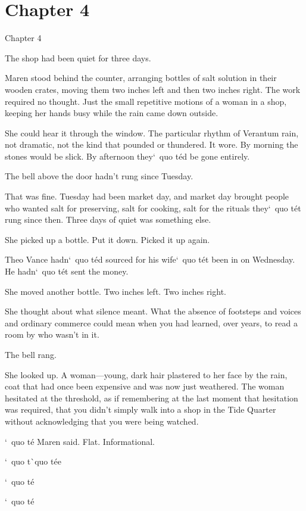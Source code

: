 \documentclass[12pt,letterpaper,openany]{book}
\begin{document}
\chapter{Chapter 4}
Chapter 4
\par
The shop had been quiet for three days.
\par
Maren stood behind the counter, arranging bottles of salt solution in their wooden crates, moving them two inches left and then two inches right. The work required no thought. Just the small repetitive motions of a woman in a shop, keeping her hands busy while the rain came down outside.
\par
She could hear it through the window. The particular rhythm of Verantum rain, not dramatic, not the kind that pounded or thundered. It wore. By morning the stones would be slick. By afternoon they`\ quo t\'e{}d be gone entirely.
\par
The bell above the door hadn't rung since Tuesday.
\par
That was fine. Tuesday had been market day, and market day brought people who wanted salt for preserving, salt for cooking, salt for the rituals they`\ quo t\'e{}t rung since then. Three days of quiet was something else.
\par
She picked up a bottle. Put it down. Picked it up again.
\par
Theo Vance hadn`\ quo t\'e{}d sourced for his wife`\ quo t\'e{}t been in on Wednesday. He hadn`\ quo t\'e{}t sent the money.
\par
She moved another bottle. Two inches left. Two inches right.
\par
She thought about what silence meant. What the absence of footsteps and voices and ordinary commerce could mean when you had learned, over years, to read a room by who wasn't in it.
\par
The bell rang.
\par
She looked up. A woman—young, dark hair plastered to her face by the rain, coat that had once been expensive and was now just weathered. The woman hesitated at the threshold, as if remembering at the last moment that hesitation was required, that you didn't simply walk into a shop in the Tide Quarter without acknowledging that you were being watched.
\par
`\ quo t\'e{} Maren said. Flat. Informational.
\par
`\ quo t\`\ quo t\'e{}e{}
\par
`\ quo t\'e{}
\par
`\ quo t\'e{}
\par
\end{document}
